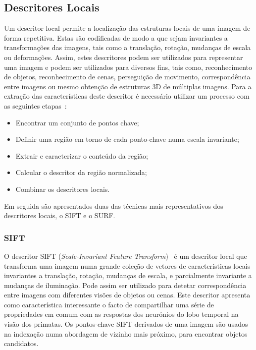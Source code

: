\subsection{Descritores Locais} \label{subsec:desclocal}

Um descritor local permite a localização das estruturas locais de uma imagem de forma repetitiva. Estas são codificadas de modo a que sejam invariantes a transformações das imagens, tais como a translação, rotação, mudanças de escala ou deformações. Assim, estes descritores podem ser utilizados para representar uma imagem e podem ser utilizados para diversos fins, tais como, reconhecimento de objetos, reconhecimento de cenas, perseguição de movimento, correspondência entre imagens ou mesmo obtenção de estruturas 3D de múltiplas imagens. 
Para a extração das características deste descritor é necessário utilizar um processo com as seguintes etapas~\cite{Gauman2010}:

\begin{itemize}
\item Encontrar um conjunto de pontos chave;
\item Definir uma região em torno de cada ponto-chave numa escala invariante;
\item Extrair e caracterizar o conteúdo da região;
\item Calcular o descritor da região normalizada;
\item Combinar os descritores locais.
\end{itemize}

Em seguida são apresentados duas das técnicas mais representativos dos descritores locais, o SIFT e o SURF.

\subsubsection{SIFT} \label{subsubsec:sift}

O descritor SIFT (\textit{Scale-Invariant Feature Transform})~\cite{Lowe1999, Lowe2004} é um descritor local que transforma uma imagem numa grande coleção de vetores de características locais invariantes a translação, rotação, mudanças de escala, e parcialmente invariante a mudanças de iluminação. Pode assim ser utilizado para detetar correspondência entre imagens com diferentes visões de objetos ou cenas.
Este descritor apresenta como característica interessante o facto de compartilhar uma série de propriedades em comum com as respostas dos neurónios do lobo temporal na visão dos primatas. Os pontos-chave SIFT derivados de uma imagem são usados na indexação numa abordagem de vizinho mais próximo, para encontrar objetos candidatos.

